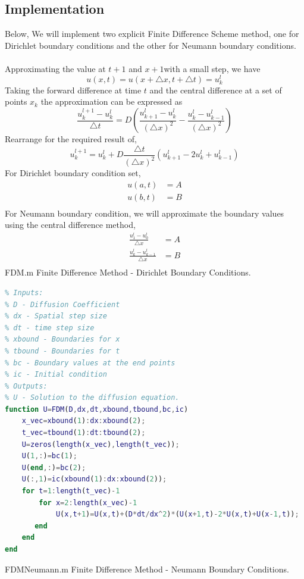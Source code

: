 \documentclass{article}
\begin{document}
\subsection{Implementation}
Below, We will implement two explicit Finite Difference Scheme method, one for Dirichlet boundary conditions and the other for Neumann boundary conditions.
\\
\\
Approximating the value at $t+1$ and $x+1$with a small step, we have
\[
	u(x,t)=u(x+\triangle x, t+\triangle t)=u^l_k
\]
Taking the forward difference at time $t$ and the central difference at a set of points $x_k$ the approximation can be expressed as
\[
	\frac{u^{l+1}_k-u^l_k}{\triangle t}=D\left(\frac{u_{k+1}^l-u_k^l}{(\triangle x)^2}-\frac{u_k^l-u_{k-1}^l}{(\triangle x)^2}\right)
\]
Rearrange for the required result of,
\[
	u^{l+1}_k=u^l_k+D\frac{\triangle t}{(\triangle x)^2}\left(u^l_{k+1}-2u^l_k+u^l_{k-1}\right)
\]
For Dirichlet boundary condition set,
\[
	\begin{split}
		u(a,t) &= A \\
		u(b,t) &= B \\
	\end{split}
\]
For Neumann boundary condition, we will approximate the boundary values using the central difference method,
\[
	\begin{split}
		\frac{u^l_1-u^l_0}{\triangle x} &= A \\
		\frac{u^l_k-u^l_{k-1}}{\triangle x} &= B \\
	\end{split}
\]
FDM.m Finite Difference Method - Dirichlet Boundary Conditions.
\begin{lstlisting}[language=MATLAB]
% Finite Difference Method with Dirichlet Boundary Conditions.
% Inputs:
% D - Diffusion Coefficient
% dx - Spatial step size
% dt - time step size
% xbound - Boundaries for x
% tbound - Boundaries for t
% bc - Boundary values at the end points
% ic - Initial condition
% Outputs:
% U - Solution to the diffusion equation.
function U=FDM(D,dx,dt,xbound,tbound,bc,ic)
    x_vec=xbound(1):dx:xbound(2);
    t_vec=tbound(1):dt:tbound(2);
    U=zeros(length(x_vec),length(t_vec));
    U(1,:)=bc(1);
    U(end,:)=bc(2);
    U(:,1)=ic(xbound(1):dx:xbound(2));
    for t=1:length(t_vec)-1
        for x=2:length(x_vec)-1
            U(x,t+1)=U(x,t)+(D*dt/dx^2)*(U(x+1,t)-2*U(x,t)+U(x-1,t));
       end
    end
end
\end{lstlisting}
FDMNeumann.m Finite Difference Method - Neumann Boundary Conditions.
\end{document}
